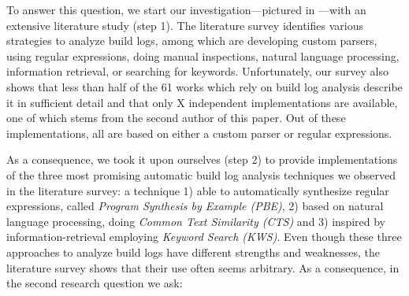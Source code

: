 To answer this question, we start our investigation---pictured in
---with an
extensive literature study (step 1).
The literature
survey identifies various strategies to
analyze build logs, among which are developing
custom parsers, using regular expressions, doing manual inspections,
natural language processing, information retrieval, or searching
for keywords.
Unfortunately, our survey also shows that
less than half of the 61 works which rely on build log analysis
describe it in sufficient detail and that
only X independent implementations are available, one of which stems
from the second author of this paper.
Out of these implementations, all are based on either a custom parser
or regular expressions.


As a consequence, we took it upon ourselves (step 2) to provide
implementations of the three most promising automatic build log analysis
techniques we observed in the literature survey:
a technique 1) able to automatically synthesize regular expressions,
called \emph{Program Synthesis by Example (PBE)}, 2) based on natural
language processing, doing \emph{Common Text Similarity (CTS)}	and 3)
inspired by information-retrieval employing \emph{Keyword Search (KWS)}.
Even though these three approaches to analyze
build logs have different strengths and weaknesses, the literature
survey shows that their use often seems arbitrary.
As a consequence,
in the second research question we ask:

